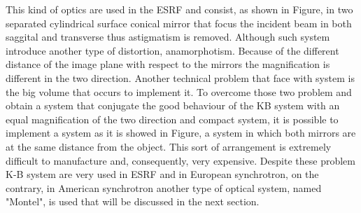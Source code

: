 \hspace{10mm} This kind of optics are used in the ESRF and consist, as shown in Figure, in two separated cylindrical surface conical mirror that focus the incident beam in both saggital and transverse thus astigmatism is removed. Although such system introduce another type of distortion, anamorphotism. Because of the different distance of the image plane with respect to the mirrors the magnification is different in the two direction.  Another technical problem that face with system is the big volume that occurs to implement it.
\noindent To overcome those two problem and obtain a system that conjugate the good behaviour of the KB system with an equal magnification of the two direction and compact system, it is possible to implement a system as it is showed in Figure, a system in which both mirrors are at the same distance from the object. This sort of arrangement is extremely difficult to manufacture and, consequently, very expensive.
\noindent Despite these problem K-B system are very used in ESRF and in European synchrotron, on the contrary, in American synchrotron another type of optical system, named "Montel", is used that will be discussed in the next section.

